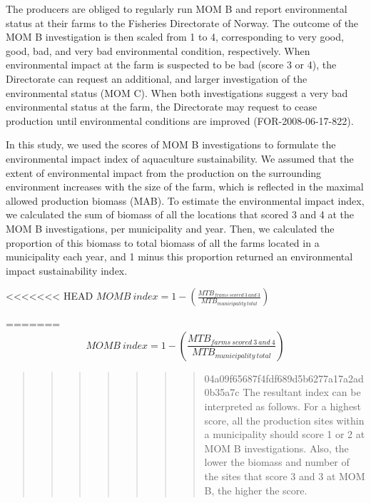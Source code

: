\documentclass[
]{book}
\begin{document}
The producers are obliged to regularly run MOM B and report environmental status at their farms to the Fisheries Directorate of Norway. The outcome of the MOM B investigation is then scaled from 1 to 4, corresponding to very good, good, bad, and very bad environmental condition, respectively. When environmental impact at the farm is suspected to be bad (score 3 or 4), the Directorate can request an additional, and larger investigation of the environmental status (MOM C). When both investigations suggest a very bad environmental status at the farm, the Directorate may request to cease production until environmental conditions are improved (FOR-2008-06-17-822).

In this study, we used the scores of MOM B investigations to formulate the environmental impact index of aquaculture sustainability. We assumed that the extent of environmental impact from the production on the surrounding environment increases with the size of the farm, which is reflected in the maximal allowed production biomass (MAB). To estimate the environmental impact index, we calculated the sum of biomass of all the locations that scored 3 and 4 at the MOM B investigations, per municipality and year. Then, we calculated the proportion of this biomass to total biomass of all the farms located in a municipality each year, and 1 minus this proportion returned an environmental impact sustainability index.

\textless\textless\textless\textless\textless\textless\textless{} HEAD
\(MOMB \ index = 1 - (\frac{MTB_{frams \ scored \ 3 \ and \ 3}}{MTB_{municipality \ total}})\)

=======
\begin{equation}
MOMB \ index  = 1 - (\frac{MTB_{farms \ scored \ 3 \ and \ 4}}{MTB_{municipality \ total}})
\label{eq:momb}
\end{equation}

\begin{quote}
\begin{quote}
\begin{quote}
\begin{quote}
\begin{quote}
\begin{quote}
\begin{quote}
04a09f65687f4fdf689d5b6277a17a2ad0b35a7c
The resultant index can be interpreted as follows. For a highest score, all the production sites within a municipality should score 1 or 2 at MOM B investigations. Also, the lower the biomass and number of the sites that score 3 and 3 at MOM B, the higher the score.
\end{quote}
\end{quote}
\end{quote}
\end{quote}
\end{quote}
\end{quote}
\end{quote}
\end{document}

